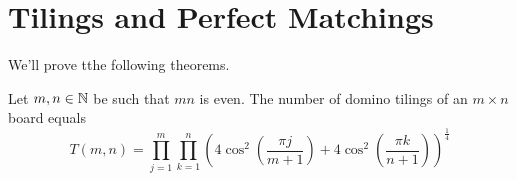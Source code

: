 \section{Tilings and Perfect Matchings}
We'll prove tthe following theorems.
\begin{theorem}[Kasteleyn (1961)]
Let \(m,n\in\mathbb{N}\) be such that \(mn\) is even.
The number of domino tilings of an \(m\times n\) board equals
\[ T(m,n)=\prod_{j=1}^{m}\prod_{k=1}^n \left(4\cos^2\left(\frac{\pi j}{m+1}\right) + 4\cos^2\left(\frac{\pi k}{n+1}\right)\right)^{\frac{1}{4}} \]
\end{theorem}